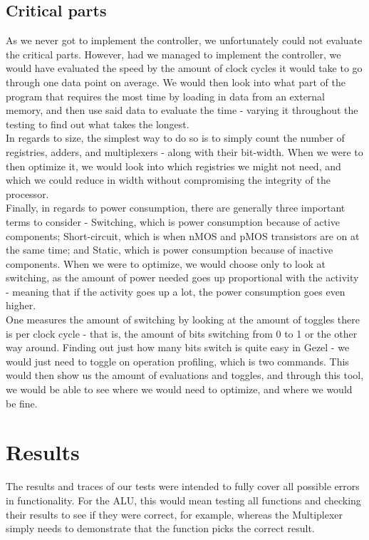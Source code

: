 \documentclass[12pt,a4paper]{article}
\begin{document}
\subsection{Critical parts}
As we never got to implement the controller, we unfortunately could not evaluate the critical parts. However, had we managed to implement the controller, we would have evaluated the speed by the amount of clock cycles it would take to go through one data point on average. We would then look into what part of the program that requires the most time by loading in data from an external memory, and then use said data to evaluate the time - varying it throughout the testing to find out what takes the longest.\\
In regards to size, the simplest way to do so is to simply count the number of registries, adders, and multiplexers - along with their bit-width. When we were to then optimize it, we would look into which registries we might not need, and which we could reduce in width without compromising the integrity of the processor.\\
Finally, in regards to power consumption, there are generally three important terms to consider - Switching, which is power consumption because of active components; Short-circuit, which is when nMOS and pMOS transistors are on at the same time; and Static, which is power consumption because of inactive components. When we were to optimize, we would choose only to look at switching, as the amount of power needed goes up proportional with the activity - meaning that if the activity goes up a lot, the power consumption goes even higher.\\
One measures the amount of switching by looking at the amount of toggles there is per clock cycle - that is, the amount of bits switching from 0 to 1 or the other way around. Finding out just how many bits switch is quite easy in Gezel - we would just need to toggle on operation profiling, which is two commands. This would then show us the amount of evaluations and toggles, and through this tool, we would be able to see where we would need to optimize, and where we would be fine.\\

\section{Results}
The results and traces of our tests were intended to fully cover all possible errors in functionality.
For the ALU, this would mean testing all functions and checking their results to see if they were correct, for example, whereas the Multiplexer simply needs to demonstrate that the function picks the correct result.
\end{document}
